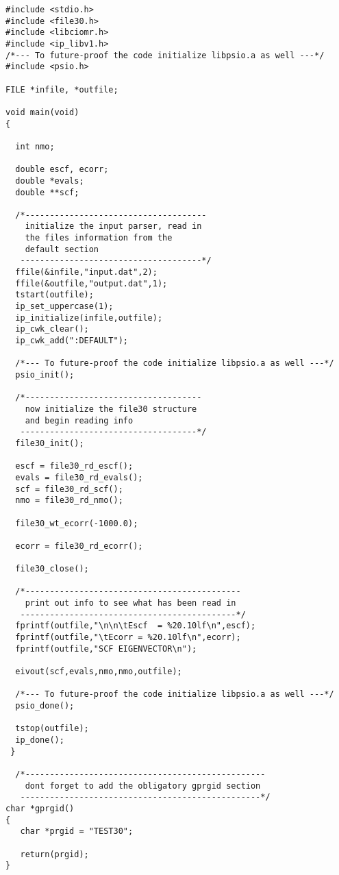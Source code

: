 \begin{verbatim}
#include <stdio.h>
#include <file30.h>
#include <libciomr.h>
#include <ip_libv1.h>
/*--- To future-proof the code initialize libpsio.a as well ---*/
#include <psio.h>

FILE *infile, *outfile;

void main(void)
{
 
  int nmo;

  double escf, ecorr;
  double *evals;
  double **scf;

  /*-------------------------------------
    initialize the input parser, read in
    the files information from the
    default section
   -------------------------------------*/
  ffile(&infile,"input.dat",2);
  ffile(&outfile,"output.dat",1);
  tstart(outfile);
  ip_set_uppercase(1);
  ip_initialize(infile,outfile);
  ip_cwk_clear();
  ip_cwk_add(":DEFAULT");

  /*--- To future-proof the code initialize libpsio.a as well ---*/
  psio_init();

  /*------------------------------------
    now initialize the file30 structure
    and begin reading info
   ------------------------------------*/
  file30_init();

  escf = file30_rd_escf();
  evals = file30_rd_evals();
  scf = file30_rd_scf();
  nmo = file30_rd_nmo();
 
  file30_wt_ecorr(-1000.0);
  
  ecorr = file30_rd_ecorr();

  file30_close();

  /*--------------------------------------------
    print out info to see what has been read in
   --------------------------------------------*/
  fprintf(outfile,"\n\n\tEscf  = %20.10lf\n",escf);
  fprintf(outfile,"\tEcorr = %20.10lf\n",ecorr);
  fprintf(outfile,"SCF EIGENVECTOR\n");

  eivout(scf,evals,nmo,nmo,outfile); 
  
  /*--- To future-proof the code initialize libpsio.a as well ---*/
  psio_done();
  
  tstop(outfile);
  ip_done();
 }

  /*-------------------------------------------------
    dont forget to add the obligatory gprgid section 
   -------------------------------------------------*/
char *gprgid()
{
   char *prgid = "TEST30";

   return(prgid);
}
\end{verbatim}

